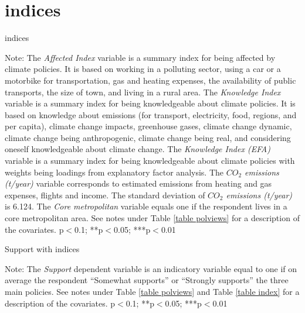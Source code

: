\documentclass{article}
\begin{document}
\clearpage
\section{indices}

\begin{table}[h!]
	\caption{indices}\label{table index}
	\begin{center}
		\scalebox{0.7}{}
	\end{center}
	{\footnotesize Note: The \textit{Affected Index} variable is a summary index for being affected by climate policies. It is based on working in a polluting sector, using a car or a motorbike for transportation, gas and heating expenses, the availability of public transports, the size of town, and living in a rural area. The \textit{Knowledge Index} variable is a summary index for being knowledgeable about climate policies. It is based on knowledge about emissions  (for transport, electricity, food, regions, and per capita), climate change impacts, greenhouse gases, climate change dynamic, climate change being anthropogenic, climate change being real, and considering oneself knowledgeable about climate change. The \textit{Knowledge Index (EFA)} variable is a summary index for being knowledgeable about climate policies with weights being loadings from explanatory factor analysis. The \textit{$CO_2$ emissions (t/year)} variable corresponds to estimated emissions from heating and gas expenses, flights and income. The standard deviation of \textit{$CO_2$ emissions (t/year)} is 6.124. The \textit{Core metropolitan} variable equals one if the respondent lives in a core metropolitan area. See notes under Table \ref{table polviews} for a description of the covariates.
	\newline *p$<$0.1; **p$<$0.05; ***p$<$0.01}
\end{table}	

\begin{table}[h!]
	\caption{Support with indices}
	\begin{center}
		\scalebox{0.7}{}
	\end{center}
	{\footnotesize Note: The \textit{Support} dependent variable is an indicatory variable equal to one if on average the respondent ``Somewhat supports'' or ``Strongly supports'' the three main policies. See notes under Table \ref{table polviews} and Table \ref{table index} for a description of the covariates.
	\newline *p$<$0.1; **p$<$0.05; ***p$<$0.01}
\end{table}	
\end{document}
